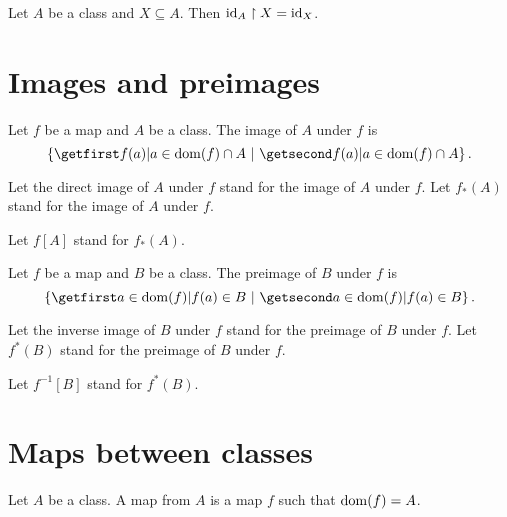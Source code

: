 \documentclass[../../set-theory/set-theory.tex]{subfiles}
\begin{document}
  \begin{forthel}
    \begin{proposition}
      Let $A$ be a class and $X \subseteq A$.
      Then $\operatorname{id}_{A} \restriction X = \operatorname{id}_{X}$.
    \end{proposition}
  \end{forthel}


  \section{Images and preimages}

  \begin{forthel}
    \begin{definition}
      Let $f$ be a map and $A$ be a class.
      The image of $A$ under $f$ is
      \[ \class{ f(a) | a \in \dom(f) \cap A }. \]
    \end{definition}

    Let the direct image of $A$ under $f$ stand for the image of $A$ under $f$.
    Let $f_{*}(A)$ stand for the image of $A$ under $f$.

    Let $f[A]$ stand for $f_{*}(A)$.
  \end{forthel}

  \begin{forthel}
    \begin{definition}
      Let $f$ be a map and $B$ be a class.
      The preimage of $B$ under $f$ is
      \[ \class{ a \in \dom(f) | f(a) \in B }. \]
    \end{definition}

    Let the inverse image of $B$ under $f$ stand for the preimage of $B$ under
    $f$.
    Let $f^{*}(B)$ stand for the preimage of $B$ under $f$.

    Let $f^{-1}[B]$ stand for $f^{*}(B)$.
  \end{forthel}


  \section{Maps between classes}

  \begin{forthel}
    \begin{definition}
      Let $A$ be a class.
      A map from $A$ is a map $f$ such that $\operatorname{dom}(f) = A$.
    \end{definition}
  \end{forthel}
\end{document}
